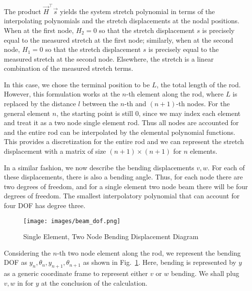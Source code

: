 The product $\vec{H}^\top\vec{s}$ yields the system stretch polynomial in terms of the interpolating polynomials and the stretch displacements at the nodal positions. When at the first node, $H_2 = 0$ so that the stretch displacement $s$ is precisely equal to the measured stretch at the first node; similarly, when at the second node, $H_1 = 0$ so that the stretch displacement $s$ is precisely equal to the measured stretch at the second node. Elsewhere, the stretch is a linear combination of the measured stretch terms.

In this case, we chose the terminal position to be $L$, the total length of the rod. However, this formulation works at the $n$-th element along the rod, where $L$ is replaced by the distance $l$ between the $n$-th and $(n+1)$-th nodes. For the general element $n$, the starting point is still $0$, since we may index each element and treat it as a two node single element rod. Thus all nodes are accounted for and the entire rod can be interpolated by the elemental polynomial functions. This provides a discretization for the entire rod and we can represent the stretch displacement with a matrix of size $(n+1) \times (n+1)$ for $n$ elements.

In a similar fashion, we now describe the bending displacements $v,w$. For each of these displacements, there is also a bending angle. Thus, for each node there are two degrees of freedom, and for a single element two node beam there will be four degrees of freedom. The smallest interpolatory polynomial that can account for four DOF has degree three. 

\begin{figure}[ht!]
\caption{Single Element, Two Node Bending Displacement Diagram}
\centering
\texttt{[image: images/beam\_dof.png]}
\label{fig:2-node-bending-dof}
\end{figure}

Considering the $n$-th two node element along the rod, we represent the bending DOF as $y_n,\theta_n,y_{n+1},\theta_{n+1}$ as shown in Fig.~\ref{fig:2-node-bending-dof}. Here, bending is represented by $y$ as a generic coordinate frame to represent either $v$ or $w$ bending. We shall plug $v,w$ in for $y$ at the conclusion of the calculation. 

